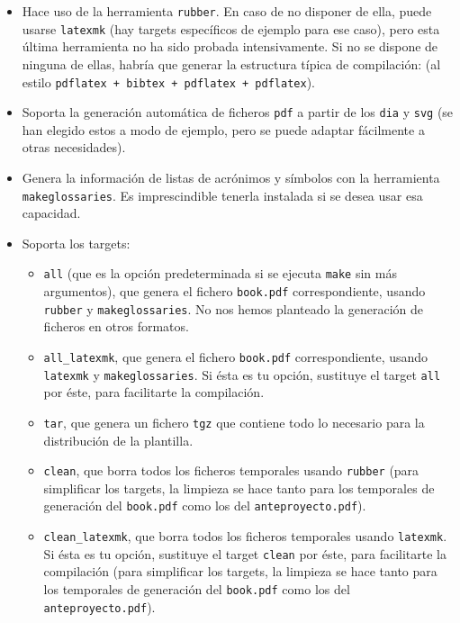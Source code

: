\documentclass[spanish,openright]{book}
\begin{document}
\begin{itemize}

\item Hace uso de la herramienta \texttt{rubber}. En caso de no disponer
  de ella, puede usarse \texttt{latexmk} (hay targets específicos de
  ejemplo para ese caso), pero esta última herramienta no ha sido
  probada intensivamente. Si no se dispone de ninguna de ellas, habría
  que generar la estructura típica de compilación: (al estilo
  \texttt{pdflatex + bibtex + pdflatex + pdflatex}).
\item Soporta la generación automática de ficheros \texttt{pdf} a partir
  de los \texttt{dia} y \texttt{svg} (se han elegido estos a modo de
  ejemplo, pero se puede adaptar fácilmente a otras necesidades).
\item Genera la información de listas de acrónimos y símbolos con la
  herramienta \texttt{makeglossaries}. Es imprescindible tenerla
  instalada si se desea usar esa capacidad.
\item Soporta los targets:
  \begin{itemize}
  \item \texttt{all} (que es la opción predeterminada si se ejecuta
    \texttt{make} sin más argumentos), que genera el fichero
    \texttt{book.pdf} correspondiente, usando \texttt{rubber} y
    \texttt{makeglossaries}. No nos hemos planteado la generación de
    ficheros en otros formatos.
  \item \texttt{all\_latexmk}, que genera el fichero \texttt{book.pdf}
    correspondiente, usando \texttt{latexmk} y
    \texttt{makeglossaries}. Si ésta  es tu opción, sustituye el target
    \texttt{all} por éste, para facilitarte la compilación.

  \item  \texttt{tar}, que genera un fichero \texttt{tgz} que contiene
    todo lo necesario para la distribución de la plantilla.
  \item \texttt{clean}, que borra todos los ficheros temporales usando
    \texttt{rubber} (para simplificar los targets, la limpieza se hace
    tanto para los temporales de generación del \texttt{book.pdf} como
    los del \texttt{anteproyecto.pdf}).
  \item \texttt{clean\_latexmk}, que borra todos los ficheros temporales
    usando \texttt{latexmk}. Si ésta es tu opción, sustituye el target
    \texttt{clean} por éste, para facilitarte la compilación (para
    simplificar los targets, la limpieza se hace tanto para los
    temporales de generación del \texttt{book.pdf} como los del
    \texttt{anteproyecto.pdf}).


\end{itemize}
\end{itemize}
\end{document}
